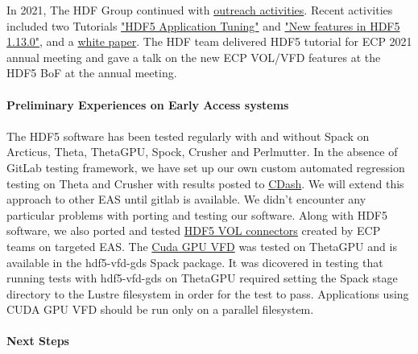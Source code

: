 In 2021, The HDF Group continued with \href{https://www.hdfgroup.org/category/hdf5-resources-for-ecp-users/}{outreach activities}. Recent activities included two Tutorials \href{https://www.hdfgroup.org/2021/05/webinar-followup-hdf5-application-tuning-there-is-more-than-one-way-to-skin-a-catfish-part-2/} {"HDF5 Application Tuning"} and \href{https://www.hdfgroup.org/2021/09/webinar-followup-new-features-in-the-hdf5-1-13-0-release}{"New features in HDF5 1.13.0"}, and a \href{https://portal.hdfgroup.org/pages/viewpage.action?pageId=73924784}{white paper}. The HDF team delivered HDF5 tutorial for ECP 2021 annual meeting and gave a talk on the new ECP VOL/VFD features at the HDF5 BoF at the annual meeting.

\paragraph{Preliminary Experiences on Early Access systems}
\paragraph{}
The HDF5 software has been tested regularly with and without Spack on Arcticus, Theta, ThetaGPU, Spock, Crusher and Perlmutter.  In the absence of GitLab testing framework, we have set up our own custom automated regression testing on Theta and Crusher with results posted to \href{https://cdash.hdfgroup.org}{CDash}.  We will extend this approach to other EAS until gitlab is available.  We didn't encounter any particular problems with porting and testing our software.  Along with HDF5 software, we also ported and tested \href{https://portal.hdfgroup.org/display/support/Registered+VOL+Connectors}{HDF5 VOL connectors} created by ECP teams on targeted EAS.  The \href{https://portal.hdfgroup.org/pages/viewpage.action?pageId=74188097}{Cuda GPU VFD} was tested on ThetaGPU and is available in the hdf5-vfd-gds Spack package.  It was dicovered in testing that running tests with hdf5-vfd-gds on ThetaGPU required setting the Spack stage directory to the Lustre filesystem in order for the test to pass.  Applications using CUDA GPU VFD should be run only on a parallel filesystem. 

\paragraph{Next Steps}
